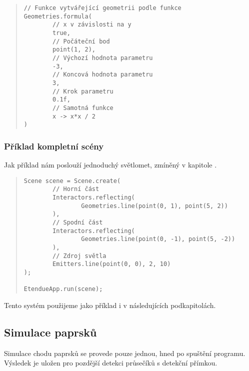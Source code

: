 \begin{minipage}{\textwidth}\begin{quote}\begin{lstlisting}
// Funkce vytvářející geometrii podle funkce
Geometries.formula(
        // x v závislosti na y
        true,
        // Počáteční bod
        point(1, 2),
        // Výchozí hodnota parametru
        -3,
        // Koncová hodnota parametru
        3,
        // Krok parametru
        0.1f,
        // Samotná funkce
        x -> x*x / 2
)
\end{lstlisting}\end{quote}\end{minipage}


\subsubsection{Příklad kompletní scény}

Jak příklad nám poslouží jednoduchý světlomet, zmíněný v kapitole .

\begin{minipage}{\textwidth}\begin{quote}\begin{lstlisting}
Scene scene = Scene.create(
        // Horní část
        Interactors.reflecting(
                Geometries.line(point(0, 1), point(5, 2))
        ),
        // Spodní část
        Interactors.reflecting(
                Geometries.line(point(0, -1), point(5, -2))
        ),
        // Zdroj světla
        Emitters.line(point(0, 0), 2, 10)
);

EtendueApp.run(scene);
\end{lstlisting}\end{quote}\end{minipage}

Tento systém použijeme jako příklad i v následujících podkapitolách.


\subsection{Simulace paprsků}
\label{sub:architekturaaplikace_simulacepaprsku}

Simulace chodu paprsků se provede pouze jednou, hned po spuštění programu. Výsledek je uložen pro pozdější detekci průsečíků s detekční přímkou.

